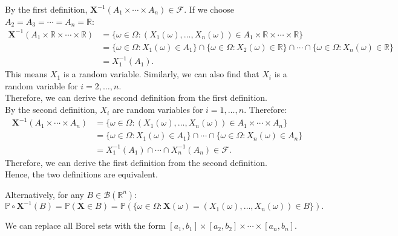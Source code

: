\documentclass{huhtakm-template-book-v2}
\newcommand{\prob}{\mathbb{P}}
\begin{document}
    \begin{proofing}
        By the first definition, $\mathbf{X}^{-1}(A_{1}\times\cdots\times A_{n}) \in \mathcal{F}$. If we choose $A_{2} = A_{3} = \cdots = A_{n} = \mathbb{R}$:
        \begin{align*}
            \mathbf{X}^{-1}(A_{1}\times\mathbb{R}\times\cdots\times\mathbb{R}) &= \{\omega \in \Omega:(X_{1}(\omega),\dots,X_{n}(\omega)) \in A_{1}\times\mathbb{R}\times\cdots\times\mathbb{R}\}\\
            &= \{\omega \in \Omega:X_{1}(\omega) \in A_{1}\}\cap\{\omega \in \Omega:X_{2}(\omega) \in \mathbb{R}\}\cap\cdots\cap\{\omega \in \Omega:X_{n}(\omega) \in \mathbb{R}\}\\
            &= X_{1}^{-1}(A_{1}).
        \end{align*}
        This means $X_{1}$ is a random variable. Similarly, we can also find that $X_{i}$ is a random variable for $i = 2,\dots,n$.\\
        Therefore, we can derive the second definition from the first definition.\\
        By the second definition, $X_{i}$ are random variables for $i = 1,\dots,n$. Therefore:
        \begin{align*}
            \mathbf{X}^{-1}(A_{1}\times\cdots\times A_{n}) &= \{\omega \in \Omega:(X_{1}(\omega),\dots,X_{n}(\omega)) \in A_{1}\times\cdots\times A_{n}\}\\
            &= \{\omega \in \Omega:X_{1}(\omega) \in A_{1}\}\cap\cdots\cap\{\omega \in \Omega:X_{n}(\omega) \in A_{n}\}\\
            &= X_{1}^{-1}(A_{1})\cap\cdots\cap X_{n}^{-1}(A_{n}) \in \mathcal{F}.
        \end{align*}
        Therefore, we can derive the first definition from the second definition.\\
        Hence, the two definitions are equivalent.
    \end{proofing}
    \begin{rem}
        Alternatively, for any $B \in \mathcal{B}(\mathbb{R}^{n})$:
        \begin{equation*}
            \prob \circ \mathbf{X}^{-1}(B) = \prob(\mathbf{X} \in B) = \prob(\{\omega \in \Omega:\mathbf{X}(\omega) = (X_{1}(\omega),\dots,X_{n}(\omega)) \in B\}).
        \end{equation*}
    \end{rem}
    \begin{rem}
        We can replace all Borel sets with the form $[a_{1},b_{1}]\times[a_{2},b_{2}]\times\cdots\times[a_{n},b_{n}]$.
    \end{rem}
\end{document}
